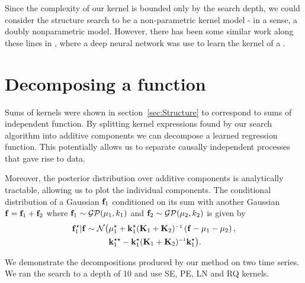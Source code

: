\documentclass[twoside]{article}
\begin{document}
Since the complexity of our kernel is bounded only by the search depth, we could consider the structure search to be a non-parametric kernel model - in a sense, a doubly nonparametric model.  However, there has been some similar work along these lines in \cite{salakhutdinov2008using}, where a deep neural network was use to learn the kernel of a \gp{}.


\section{Decomposing a function}

Sums of kernels were shown in section~\ref{sec:Structure} to correspond to sums of independent function.
By splitting kernel expressions found by our search algorithm into additive components we can decompose a learned regression function.
This potentially allows us to separate causally independent processes that gave rise to data.

Moreover, the posterior distribution over additive components is analytically tractable, allowing us to plot the individual components.
The conditional distribution of a Gaussian ${\bf{f}}_1$ conditioned on its sum with another Gaussian ${\bf{f}} = {\bf{f}}_1 + {\bf{f}}_2$ where ${\bf{f}}_1 \sim \mathcal{GP}( {\bf{\mu}}_1, k_1)$ and ${\bf{f}}_2 \sim \mathcal{GP}( {\bf{\mu}}_2, k_2)$ is given by
\begin{align}
\vf_1^\star | \vf \sim \mathcal{N} \big( & \vmu_1^\star + \vk_1^\star (\vK_1 + \vK_2)\inv \left( \vf - \vmu_1 - \vmu_2 \right), \nonumber \\
& \vk_1^{\star\star} - \vk_1^\star (\vK_1 + \vK_2)\inv \vk_1^\star \big).
\end{align}

We demonstrate the decompositions produced by our method on two time series.
We ran the search to a depth of 10 and use SE, PE, LN and RQ kernels.

% 
\end{document}
